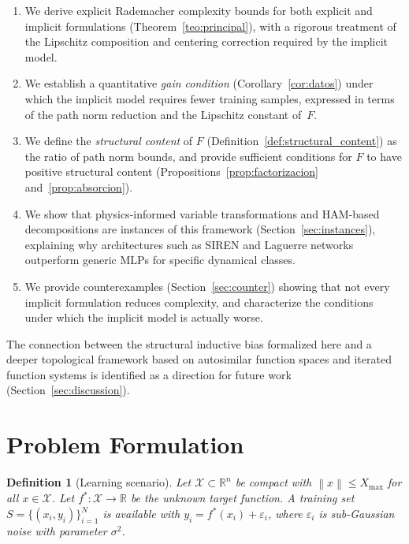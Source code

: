 \documentclass[12pt]{article}
\newtheorem{definition}[theorem]{Definition}
\newcommand{\R}{\mathbb{R}}
\newcommand{\norm}[1]{\left\|#1\right\|}
\begin{document}
\begin{enumerate}
  \item We derive explicit Rademacher complexity bounds for both
    explicit and implicit formulations
    (Theorem~\ref{teo:principal}), with a rigorous treatment of the
    Lipschitz composition and centering correction required by the
    implicit model.
  \item We establish a quantitative \emph{gain condition}
    (Corollary~\ref{cor:datos}) under which the implicit model
    requires fewer training samples, expressed in terms of the
    path norm reduction and the Lipschitz constant of~$F$.
  \item We define the \emph{structural content} of $F$
    (Definition~\ref{def:structural_content}) as the ratio of path
    norm bounds, and provide sufficient conditions for $F$ to have
    positive structural content (Propositions~\ref{prop:factorizacion}
    and~\ref{prop:absorcion}).
  \item We show that physics-informed variable transformations and
    HAM-based decompositions are instances of this framework
    (Section~\ref{sec:instances}), explaining why architectures
    such as SIREN \cite{Sitzmann2020} and Laguerre networks
    outperform generic MLPs for specific dynamical classes.
  \item We provide counterexamples (Section~\ref{sec:counter})
    showing that not every implicit formulation reduces complexity,
    and characterize the conditions under which the implicit model
    is actually worse.
\end{enumerate}

The connection between the structural inductive bias formalized here
and a deeper topological framework based on autosimilar function
spaces and iterated function systems is identified as a direction for
future work (Section~\ref{sec:discussion}).

\section{Problem Formulation}
\label{sec:formulation}

\begin{definition}[Learning scenario]
\label{def:scenario}
Let $\mathcal{X} \subset \R^n$ be compact with $\norm{x} \le X_{\max}$
for all $x \in \mathcal{X}$.
Let $f^*: \mathcal{X} \to \R$ be the unknown target function.
A training set $S = \{(x_i, y_i)\}_{i=1}^N$ is available with
$y_i = f^*(x_i) + \varepsilon_i$, where $\varepsilon_i$ is
sub-Gaussian noise with parameter $\sigma^2$.
\end{definition}
\end{document}
